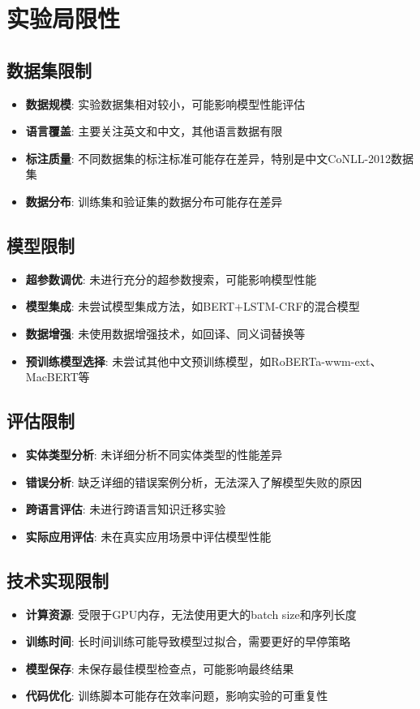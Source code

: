 \documentclass{article}
\begin{document}
\section{实验局限性}

\subsection{数据集限制}
\begin{itemize}
    \item \textbf{数据规模}: 实验数据集相对较小，可能影响模型性能评估
    \item \textbf{语言覆盖}: 主要关注英文和中文，其他语言数据有限
    \item \textbf{标注质量}: 不同数据集的标注标准可能存在差异，特别是中文CoNLL-2012数据集
    \item \textbf{数据分布}: 训练集和验证集的数据分布可能存在差异
\end{itemize}

\subsection{模型限制}
\begin{itemize}
    \item \textbf{超参数调优}: 未进行充分的超参数搜索，可能影响模型性能
    \item \textbf{模型集成}: 未尝试模型集成方法，如BERT+LSTM-CRF的混合模型
    \item \textbf{数据增强}: 未使用数据增强技术，如回译、同义词替换等
    \item \textbf{预训练模型选择}: 未尝试其他中文预训练模型，如RoBERTa-wwm-ext、MacBERT等
\end{itemize}

\subsection{评估限制}
\begin{itemize}
    \item \textbf{实体类型分析}: 未详细分析不同实体类型的性能差异
    \item \textbf{错误分析}: 缺乏详细的错误案例分析，无法深入了解模型失败的原因
    \item \textbf{跨语言评估}: 未进行跨语言知识迁移实验
    \item \textbf{实际应用评估}: 未在真实应用场景中评估模型性能
\end{itemize}

\subsection{技术实现限制}
\begin{itemize}
    \item \textbf{计算资源}: 受限于GPU内存，无法使用更大的batch size和序列长度
    \item \textbf{训练时间}: 长时间训练可能导致模型过拟合，需要更好的早停策略
    \item \textbf{模型保存}: 未保存最佳模型检查点，可能影响最终结果
    \item \textbf{代码优化}: 训练脚本可能存在效率问题，影响实验的可重复性
\end{itemize}
\end{document}
